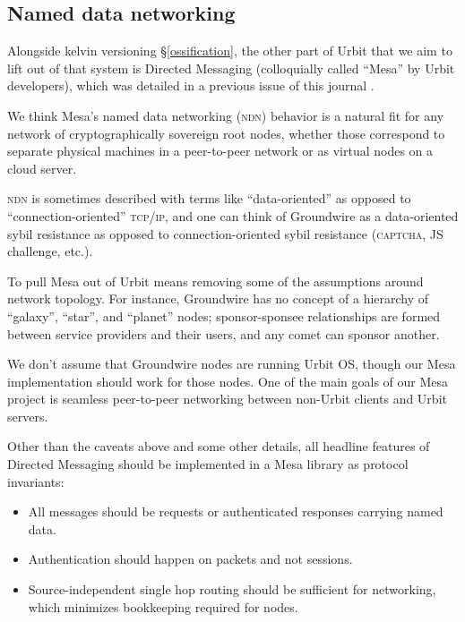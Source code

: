 \documentclass[twoside]{article}
\begin{document}
\subsection{Named data networking}\label{named-data-networking}

Alongside kelvin versioning \S\ref{ossification}, the other part of Urbit that we aim
to lift out of that system is Directed Messaging (colloquially called
``Mesa'' by Urbit developers), which was detailed in a previous issue of
this journal \citep{DirectedMessaging2026}.

We think Mesa's named data networking (\textsc{ndn}) behavior is a natural fit
for any network of cryptographically sovereign root nodes, whether those
correspond to separate physical machines in a peer-to-peer network or as
virtual nodes on a cloud server.

\textsc{ndn} is sometimes described with terms like ``data-oriented'' as opposed
to ``connection-oriented'' \textsc{tcp/ip}, and one can think of Groundwire as a
data-oriented sybil resistance as opposed to connection-oriented sybil
resistance (\textsc{captcha}, JS challenge, etc.).

To pull Mesa out of Urbit means removing some of the assumptions around
network topology. For instance, Groundwire has no concept of a hierarchy
of ``galaxy'', ``star'', and ``planet'' nodes; sponsor-sponsee
relationships are formed between service providers and their users, and
any comet can sponsor another.

We don't assume that Groundwire nodes are running Urbit OS, though our
Mesa implementation should work for those nodes. One of the main goals
of our Mesa project is seamless peer-to-peer networking between
non-Urbit clients and Urbit servers.

Other than the caveats above and some other details, all headline
features of Directed Messaging should be implemented in a Mesa library
as protocol invariants:

\begin{itemize}[noitemsep,topsep=2pt]

\item
  All messages should be requests or authenticated responses carrying
  named data.
\item
  Authentication should happen on packets and not sessions.
\item
  Source-independent single hop routing should be sufficient for
  networking, which minimizes bookkeeping required for nodes.
\end{itemize}
\end{document}
